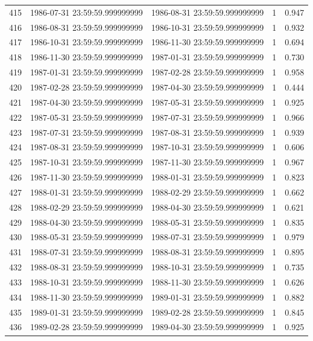 \begin{table}
\begin{tabular}{lcccc}
415 & 1986-07-31 23:59:59.999999999 & 1986-08-31 23:59:59.999999999 & 1 & 0.947 \\
416 & 1986-08-31 23:59:59.999999999 & 1986-10-31 23:59:59.999999999 & 1 & 0.932 \\
417 & 1986-10-31 23:59:59.999999999 & 1986-11-30 23:59:59.999999999 & 1 & 0.694 \\
418 & 1986-11-30 23:59:59.999999999 & 1987-01-31 23:59:59.999999999 & 1 & 0.730 \\
419 & 1987-01-31 23:59:59.999999999 & 1987-02-28 23:59:59.999999999 & 1 & 0.958 \\
420 & 1987-02-28 23:59:59.999999999 & 1987-04-30 23:59:59.999999999 & 1 & 0.444 \\
421 & 1987-04-30 23:59:59.999999999 & 1987-05-31 23:59:59.999999999 & 1 & 0.925 \\
422 & 1987-05-31 23:59:59.999999999 & 1987-07-31 23:59:59.999999999 & 1 & 0.966 \\
423 & 1987-07-31 23:59:59.999999999 & 1987-08-31 23:59:59.999999999 & 1 & 0.939 \\
424 & 1987-08-31 23:59:59.999999999 & 1987-10-31 23:59:59.999999999 & 1 & 0.606 \\
425 & 1987-10-31 23:59:59.999999999 & 1987-11-30 23:59:59.999999999 & 1 & 0.967 \\
426 & 1987-11-30 23:59:59.999999999 & 1988-01-31 23:59:59.999999999 & 1 & 0.823 \\
427 & 1988-01-31 23:59:59.999999999 & 1988-02-29 23:59:59.999999999 & 1 & 0.662 \\
428 & 1988-02-29 23:59:59.999999999 & 1988-04-30 23:59:59.999999999 & 1 & 0.621 \\
429 & 1988-04-30 23:59:59.999999999 & 1988-05-31 23:59:59.999999999 & 1 & 0.835 \\
430 & 1988-05-31 23:59:59.999999999 & 1988-07-31 23:59:59.999999999 & 1 & 0.979 \\
431 & 1988-07-31 23:59:59.999999999 & 1988-08-31 23:59:59.999999999 & 1 & 0.895 \\
432 & 1988-08-31 23:59:59.999999999 & 1988-10-31 23:59:59.999999999 & 1 & 0.735 \\
433 & 1988-10-31 23:59:59.999999999 & 1988-11-30 23:59:59.999999999 & 1 & 0.626 \\
434 & 1988-11-30 23:59:59.999999999 & 1989-01-31 23:59:59.999999999 & 1 & 0.882 \\
435 & 1989-01-31 23:59:59.999999999 & 1989-02-28 23:59:59.999999999 & 1 & 0.845 \\
436 & 1989-02-28 23:59:59.999999999 & 1989-04-30 23:59:59.999999999 & 1 & 0.925 \\

\end{tabular}
\end{table}
